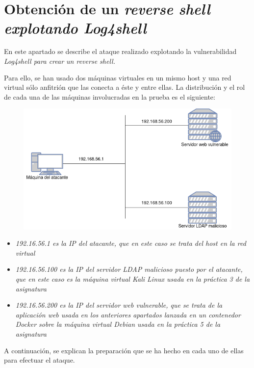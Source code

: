 \documentclass[../main.tex]{subfiles}
\begin{document}
\section{Obtención de un \it{reverse shell} explotando Log4shell}

En este apartado se describe el ataque realizado explotando la vulnerabilidad \it{Log4shell} para crear un \it{reverse shell}.

Para ello, se han usado dos máquinas virtuales en un mismo host y una red virtual sólo anfitrión que las conecta a éste y entre ellas. La distribución y el rol de cada una de las máquinas involucradas en la prueba es el siguiente:
\begin{figure}[!h]
\centering
\includegraphics[width=15.0cm]{imagenes/4-ReverseShell/Ataque.drawio.png}
\end{figure}
\begin{itemize}
    \item \it{192.16.56.1} es la IP del atacante, que en este caso se trata del host en la red virtual
    \item \it{192.16.56.100} es la IP del servidor LDAP malicioso puesto por el atacante, que en este caso es la máquina virtual \it{Kali Linux} usada en la práctica 3 de la asignatura
    \item \it{192.16.56.200} es la IP del servidor web vulnerable, que se trata de la aplicación web usada en los anteriores apartados \cite{vulnerable-app} lanzada en un contenedor Docker sobre la máquina virtual \it{Debian} usada en la práctica 5 de la asignatura
\end{itemize}

A continuación, se explican la preparación que se ha hecho en cada uno de ellas para efectuar el ataque.

\end{document}
